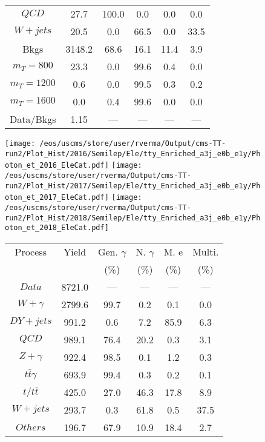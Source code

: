 \begin{figure}
\begin{minipage}[c]{0.32\textwidth}
{\begin{tabular}{cccccc}
$ QCD $ &  27.7 &  100.0 &  0.0 &  0.0 &  0.0\\
$ W+jets $ &  20.5 &  0.0 &  66.5 &  0.0 &  33.5\\
Bkgs &  3148.2 &  68.6 &  16.1 &  11.4 &  3.9\\
$ m_{T} = 800 $ &  23.3 &  0.0 &  99.6 &  0.4 &  0.0\\
$ m_{T} = 1200 $ &  0.6 &  0.0 &  99.5 &  0.3 &  0.2\\
$ m_{T} = 1600 $ &  0.0 &  0.4 &  99.6 &  0.0 &  0.0\\
Data/Bkgs &  1.15 &  --- &  --- &  --- &  ---\\
\hline
\end{tabular}
}
\end{minipage}
\end{figure}

\begin{figure}
\centering
\texttt{[image: /eos/uscms/store/user/rverma/Output/cms-TT-run2/Plot\_Hist/2016/Semilep/Ele/tty\_Enriched\_a3j\_e0b\_e1y/Photon\_et\_2016\_EleCat.pdf]}
\texttt{[image: /eos/uscms/store/user/rverma/Output/cms-TT-run2/Plot\_Hist/2017/Semilep/Ele/tty\_Enriched\_a3j\_e0b\_e1y/Photon\_et\_2017\_EleCat.pdf]}
\texttt{[image: /eos/uscms/store/user/rverma/Output/cms-TT-run2/Plot\_Hist/2018/Semilep/Ele/tty\_Enriched\_a3j\_e0b\_e1y/Photon\_et\_2018\_EleCat.pdf]}
\begin{minipage}[c]{0.32\textwidth}
\centering
\tiny{
\begin{tabular}{cccccc}
\hline
Process & Yield & Gen. $\gamma$ & N. $\gamma$ & M. e & Multi. \\
 &  & (\%) & (\%) & (\%) & (\%)  \\
\hline
                                                                      $ Data $ &  8721.0 &  --- &  --- &  --- &  ---\\
$ W+\gamma $ &  2799.6 &  99.7 &  0.2 &  0.1 &  0.0\\
$ DY+jets $ &  991.2 &  0.6 &  7.2 &  85.9 &  6.3\\
$ QCD $ &  989.1 &  76.4 &  20.2 &  0.3 &  3.1\\
$ Z+\gamma $ &  922.4 &  98.5 &  0.1 &  1.2 &  0.3\\
$ t\bar{t}\gamma $ &  693.9 &  99.4 &  0.3 &  0.2 &  0.1\\
$ t/t\bar{t} $ &  425.0 &  27.0 &  46.3 &  17.8 &  8.9\\
$ W+jets $ &  293.7 &  0.3 &  61.8 &  0.5 &  37.5\\
$ Others $ &  196.7 &  67.9 &  10.9 &  18.4 &  2.7\\

\end{tabular}}
\end{minipage}
\end{figure}
